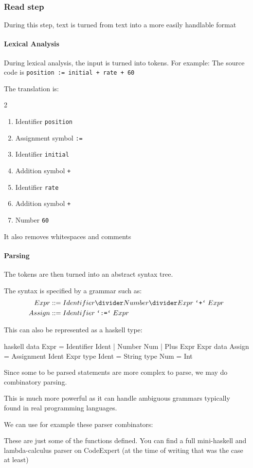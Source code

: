 \subsubsection{Read step}
During this step, text is turned from text into a more easily handlable format


\paragraph{Lexical Analysis}
During lexical analysis, the input is turned into tokens.
For example: The source code is \texttt{position := initial + rate + 60}

The translation is:
\begin{multicols}{2}
    \begin{enumerate}
        \item Identifier \texttt{position}
        \item Assignment symbol \texttt{:=}
        \item Identifier \texttt{initial}
        \item Addition symbol \texttt{+}
        \item Identifier \texttt{rate}
        \item Addition symbol \texttt{+}
        \item Number \texttt{60}
    \end{enumerate}
\end{multicols}

It also removes whitespaces and comments


\paragraph{Parsing}
The tokens are then turned into an abstract syntax tree.

The syntax is specified by a grammar such as:
\begin{align*}
    Expr   & ::= Identifier \divider Number \divider Expr\; \texttt{`+`}\; Expr \\
    Assign & ::= Identifier\; \texttt{`:=`}\; Expr
\end{align*}

This can also be represented as a haskell type:
\begin{code}{haskell}
    data Expr = Identifier Ident | Number Num | Plus Expr Expr
    data Assign = Assignment Ident Expr
    type Ident = String
    type Num = Int
\end{code}

Since some to be parsed statements are more complex to parse, we may do combinatory parsing.

This is much more powerful as it can handle ambiguous grammars typically found in real programming languages.

We can use for example these parser combinators:

\newpage
{}

These are just some of the functions defined.
You can find a full mini-haskell and lambda-calculus parser on CodeExpert (at the time of writing that was the case at least)
